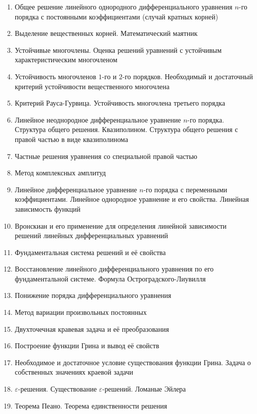 \begin{enumerate}
\item
  Общее решение линейного однородного дифференциального уравнения
  \(n\)-го порядка с постоянными коэффициентами (случай кратных корней)
\item
  Выделение вещественных корней. Математический маятник
\item
  Устойчивые многочлены. Оценка решений уравнений с устойчивым
  характеристическим многочленом
\item
  Устойчивость многочленов \(1\)-го и \(2\)-го порядков. Необходимый и
  достаточный критерий устойчивости вещественного многочлена
\item
  Критерий Рауса-Гурвица. Устойчивость многочлена третьего порядка
\item
  Линейное неоднородное дифференциальное уравнение \(n\)-го порядка.
  Структура общего решения. Квазиполином. Структура общего решения с
  правой частью в виде квазиполинома
\item
  Частные решения уравнения со специальной правой частью
\item
  Метод комплексных амплитуд
\item
  Линейное дифференциальное уравнение \(n\)-го порядка с переменными
  коэффициентами. Линейное однородное уравнение и его свойства. Линейная
  зависимость функций
\item
  Вронскиан и его применение для определения линейной зависимости
  решений линейных дифференциальных уравнений
\item
  Фундаментальная система решений и её свойства
\item
  Восстановление линейного дифференциального уравнения по его
  фундаментальной системе. Формула Остроградского-Лиувилля
\item
  Понижение порядка дифференциального уравнения
\item
  Метод вариации произвольных постоянных
\item
  Двухточечная кравевая задача и её преобразования
\item
  Построение функции Грина и вывод её свойств
\item
  Необходимое и достаточное условие существования функции Грина. Задача
  о собственных значениях краевой задачи
\item
  \(\varepsilon\)-решения. Существование \(\varepsilon\)-решений.
  Ломаные Эйлера
\item
  Теорема Пеано. Теорема единственности решения
\end{enumerate}
